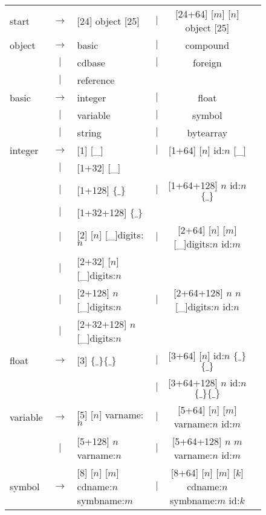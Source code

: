 \def\abyte{[\_]}\def\fourbytes{\ensuremath{\{\_\}}}
\begin{figure}\centering\footnotesize
\begin{center}
\begin{tabular}{lcp{6cm}lcp{5cm}}
  start  &  $\longrightarrow$& [24] object [25] 
           &  $|$ &  [24+64] [$m$]  [$n$] object [25]\\
   object  & $\longrightarrow$& basic
      & $|$ &  compound &\\
      & $|$ & cdbase
      & $|$ & foreign \\
      & $|$ & reference &\\
    basic & $\longrightarrow$ &  integer  
      & $|$ &  float \\
      & $|$ &  variable 
      & $|$ &  symbol   \\
      & $|$ &  string 
      & $|$ &  bytearray \\
    integer  & $\longrightarrow$&[1] \abyte 
      & $|$ & [1+64] [$n$] id:$n$ \abyte\\
      & $|$ &  [1+32] \abyte  & &  \\
      & $|$ &  [1+128] \fourbytes 
      &  $|$ & [1+64+128] {$n$} id:$n$ \fourbytes\\
      & $|$ &  [1+32+128] \fourbytes  &
      &  &\\
      & $|$ &  [2] [$n$] \abyte digits:$n$
      & $|$ & [2+64] [$n$] [$m$] \abyte digits:$n$ id:$m$\\
      & $|$ & [2+32] [$n$] \abyte digits:$n$ & 
      &  \\
      & $|$ & [2+128] {$n$} \abyte digits:$n$
      & $|$ & [2+64+128] {$n$} {$n$} \abyte digits:$n$ id:$n$\\
      & $|$ & [2+32+128] {$n$} \abyte digits:$n$
      & & \\
   float  & $\longrightarrow$& [3] \fourbytes\fourbytes 
       & $|$ & [3+64] [$n$] id:$n$ \fourbytes\fourbytes\\
       & &
       & $|$ & [3+64+128] {$n$} id:$n$ \fourbytes\fourbytes\\
    variable  & $\longrightarrow$& [5] [$n$] varname:$n$
       & $|$ & [5+64] [$n$] [$m$] varname:$n$ id:$m$\\
       & $|$ & [5+128] {$n$} varname:$n$
       & $|$ & [5+64+128] {$n$} {$m$} varname:$n$ id:$m$\\
    symbol & $\longrightarrow$& [8] [$n$] [$m$] cdname:$n$ symbname:$m$
       & $|$ & [8+64] [$n$] [$m$] [$k$] cdname:$n$ symbname:$m$ id:$k$\\

\end{tabular}
\end{center}
\end{figure}
